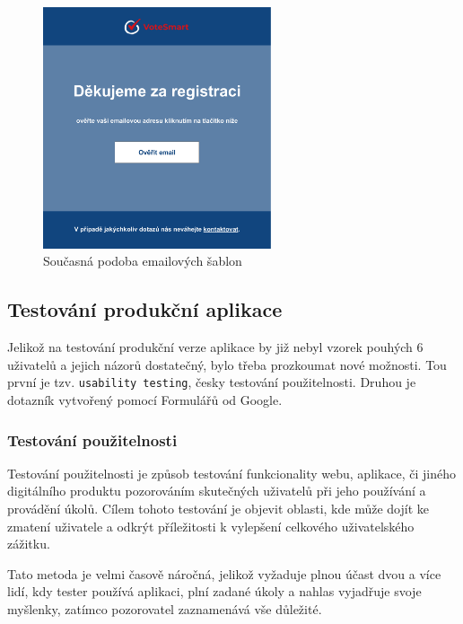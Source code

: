 \begin{figure}
    \centering
    \includegraphics[width=0.6\textwidth]{obrazky-figures/Email.pdf}
    \caption{Současná podoba emailových šablon}
    \label{fig:graphic-email}
\end{figure}

\subsection{Testování produkční aplikace}
Jelikož na testování produkční verze aplikace by již nebyl vzorek pouhých 6 uživatelů a jejich názorů dostatečný, bylo třeba prozkoumat nové možnosti. Tou první je tzv. \texttt{usability testing}, česky testování použitelnosti. Druhou je dotazník vytvořený pomocí Formulářů od Google.

\subsubsection{Testování použitelnosti}
Testování použitelnosti je způsob testování funkcionality webu, aplikace, či jiného digitálního produktu pozorováním skutečných uživatelů při jeho používání a provádění úkolů. Cílem tohoto testování je objevit oblasti, kde může dojít ke zmatení uživatele a odkrýt příležitosti k vylepšení celkového uživatelského zážitku\cite{hotjar-usability-testing}. 
\par Tato metoda je velmi časově náročná, jelikož vyžaduje plnou účast dvou a více lidí, kdy tester používá aplikaci, plní zadané úkoly a nahlas vyjadřuje svoje myšlenky, zatímco pozorovatel zaznamenává vše důležité.

